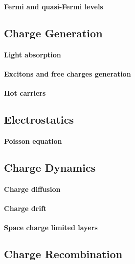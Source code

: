 \paragraph{Fermi and quasi-Fermi levels}

\subsection{Charge Generation}

\paragraph{Light absorption}

\paragraph{Excitons and free charges generation}

\paragraph{Hot carriers}

\subsection{Electrostatics}

\paragraph{Poisson equation}
	
\subsection{Charge Dynamics}

\paragraph{Charge diffusion}

\paragraph{Charge drift}

\paragraph{Space charge limited layers}

\subsection{Charge Recombination}

